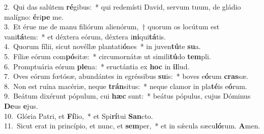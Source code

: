 {2.~}Qui das salútem \textbf{ré}gibus:~* qui redemísti David, servum tuum, de gládio malígno: \textbf{é}ri\textbf{pe} me.\\
{3.~}Et érue me de manu filiórum alienórum,~† quorum os locútum est vani\textbf{tá}tem:~* et déxtera eórum, déxtera i\textbf{ni}qui\textbf{tá}tis.\\
{4.~}Quorum fílii, sicut novéllæ plantati\textbf{ó}nes~* in juven\textbf{tú}te \textbf{su}a.\\
{5.~}Fíliæ eórum com\textbf{pó}sitæ:~* circumornátæ ut simili\textbf{tú}do \textbf{tem}pli.\\
{6.~}Promptuária eórum \textbf{ple}na:~* eructántia ex \textbf{hoc} in \textbf{il}lud.\\
{7.~}Oves eórum fœtósæ, abundántes in egréssibus \textbf{su}is:~* boves e\textbf{ó}rum \textbf{cras}sæ.\\
{8.~}Non est ruína macériæ, neque \textbf{trán}situs:~* neque clamor in pla\textbf{té}is e\textbf{ó}rum.\\
{9.~}Beátum dixérunt pópulum, cui \textbf{hæc} sunt:~* beátus pópulus, cujus Dóminus \textbf{De}us \textbf{e}jus.\\
{10.~}Glória Patri, et \textbf{Fí}lio,~* et Spi\textbf{rí}tui \textbf{San}cto.\\
{11.~}Sicut erat in princípio, et nunc, et \textbf{sem}per,~* et in sǽcula sæcu\textbf{ló}rum. \textbf{A}men.\\
